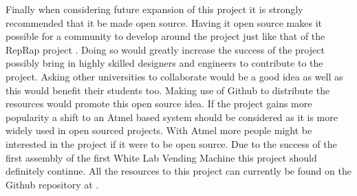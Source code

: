 \documentclass[a4paper,11pt]{article}
\numberwithin{figure}{section}
\numberwithin{table}{section}
\begin{document}
Finally when considering future expansion of this project it is strongly recommended that it be made open source. Having it open source makes it possible for a community to develop around the project just like that of the RepRap project \cite{reprap}. Doing so would greatly increase the success of the project possibly bring in highly skilled designers and engineers to contribute to the project. Asking other universities to collaborate would be a good idea as well as this would benefit their students too. Making use of Github to distribute the resources would promote this open source idea. If the project gains more popularity a shift to an Atmel based system should be considered as it is more widely used in open sourced projects. With Atmel more people might be interested in the project if it were to be open source. Due to the success of the first assembly of the first White Lab Vending Machine this project should definitely continue. All the resources to this project can currently be found on the Github repository at \cite{github}.
\newpage




\newpage
\end{document}
